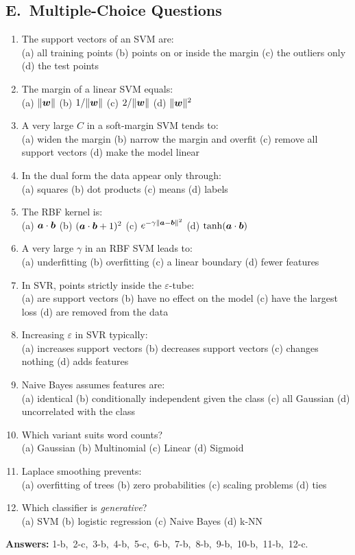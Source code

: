 \subsection*{E.\ Multiple-Choice Questions}
\begin{enumerate}
  \item The support vectors of an SVM are: \\
  (a) all training points \quad (b) points on or inside the margin \quad (c) the outliers only \quad (d) the test points
  \item The margin of a linear SVM equals: \\
  (a) $\|\boldsymbol{w}\|$ \quad (b) $1/\|\boldsymbol{w}\|$ \quad (c) $2/\|\boldsymbol{w}\|$ \quad (d) $\|\boldsymbol{w}\|^2$
  \item A very large $C$ in a soft-margin SVM tends to: \\
  (a) widen the margin \quad (b) narrow the margin and overfit \quad (c) remove all support vectors \quad (d) make the model linear
  \item In the dual form the data appear only through: \\
  (a) squares \quad (b) dot products \quad (c) means \quad (d) labels
  \item The RBF kernel is: \\
  (a) $\boldsymbol{a}\cdot\boldsymbol{b}$ \quad (b) $(\boldsymbol{a}\cdot\boldsymbol{b}+1)^2$ \quad (c) $e^{-\gamma\|\boldsymbol{a}-\boldsymbol{b}\|^2}$ \quad (d) $\tanh(\boldsymbol{a}\cdot\boldsymbol{b})$
  \item A very large $\gamma$ in an RBF SVM leads to: \\
  (a) underfitting \quad (b) overfitting \quad (c) a linear boundary \quad (d) fewer features
  \item In SVR, points strictly inside the $\varepsilon$-tube: \\
  (a) are support vectors \quad (b) have no effect on the model \quad (c) have the largest loss \quad (d) are removed from the data
  \item Increasing $\varepsilon$ in SVR typically: \\
  (a) increases support vectors \quad (b) decreases support vectors \quad (c) changes nothing \quad (d) adds features
  \item Naive Bayes assumes features are: \\
  (a) identical \quad (b) conditionally independent given the class \quad (c) all Gaussian \quad (d) uncorrelated with the class
  \item Which variant suits word counts? \\
  (a) Gaussian \quad (b) Multinomial \quad (c) Linear \quad (d) Sigmoid
  \item Laplace smoothing prevents: \\
  (a) overfitting of trees \quad (b) zero probabilities \quad (c) scaling problems \quad (d) ties
  \item Which classifier is \emph{generative}? \\
  (a) SVM \quad (b) logistic regression \quad (c) Naive Bayes \quad (d) k-NN
\end{enumerate}
\textbf{Answers:} 1-b,\ 2-c,\ 3-b,\ 4-b,\ 5-c,\ 6-b,\ 7-b,\ 8-b,\ 9-b,\ 10-b,\ 11-b,\ 12-c.

